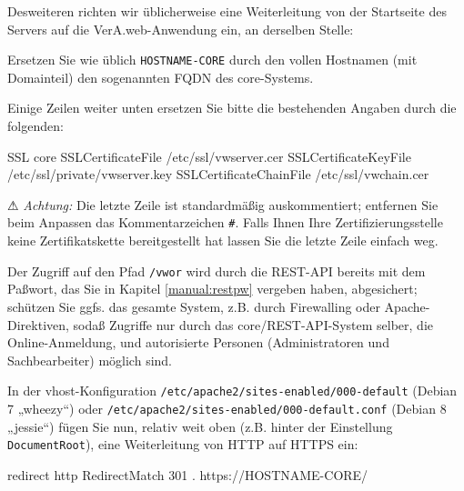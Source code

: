 \begin{minipage}{\textwidth}
Desweiteren richten wir üblicherweise eine Weiterleitung von der
Startseite des Servers auf die VerA.web-Anwendung ein, an derselben Stelle:

\end{minipage}

Ersetzen Sie wie üblich \texttt{HOSTNAME-CORE} durch den vollen
Hostnamen (mit Domainteil) \dash den sogenannten FQDN \dash des
core-Systems.

\begin{minipage}{\textwidth}
Einige Zeilen weiter unten ersetzen Sie bitte die bestehenden
Angaben durch die folgenden:

\begin{lstdump}{SSL core}
SSLCertificateFile /etc/ssl/vwserver.cer
SSLCertificateKeyFile /etc/ssl/private/vwserver.key
SSLCertificateChainFile /etc/ssl/vwchain.cer
\end{lstdump}

⚠ \emph{Achtung:} Die letzte Zeile ist standardmäßig auskommentiert;
entfernen Sie beim Anpassen das Kommentarzeichen \texttt{\#}. Falls
Ihnen Ihre Zertifizierungsstelle keine Zertifikatskette bereitgestellt
hat lassen Sie die letzte Zeile einfach weg.
\end{minipage}

Der Zugriff auf den Pfad \texttt{/vwor} wird durch die REST-API bereits
mit dem Paßwort, das Sie in Kapitel \ref{manual:restpw} vergeben haben,
abgesichert; schützen Sie ggfs. das gesamte System, z.B. durch Firewalling
oder Apache-Direktiven, sodaß Zugriffe nur durch das core/REST-API-System
selber, die Online-Anmeldung, und autorisierte Personen (Administratoren
und Sachbearbeiter) möglich sind.

\begin{minipage}{\textwidth}
In der vhost-Konfiguration \texttt{/etc/apache2/sites-enabled/000-default}
(Debian 7 „wheezy“) oder \texttt{/etc/apache2/sites-enabled/000-default.conf}
(Debian 8 „jessie“) fügen Sie nun, relativ weit oben (z.B. hinter der Einstellung
\texttt{DocumentRoot}), eine Weiterleitung von HTTP auf HTTPS ein:

\begin{lstdump}{redirect http}
RedirectMatch 301 . https://HOSTNAME-CORE/
\end{lstdump}
\end{minipage}

